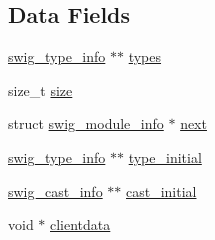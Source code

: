 \subsection*{Data Fields}
\begin{DoxyCompactItemize}
\item 
\hyperlink{structswig__type__info}{swig\-\_\-type\-\_\-info} $\ast$$\ast$ \hyperlink{structswig__module__info_ab3f7a3650d62b94bd66b389d74eec755}{types}
\item 
size\-\_\-t \hyperlink{structswig__module__info_a854352f53b148adc24983a58a1866d66}{size}
\item 
struct \hyperlink{structswig__module__info}{swig\-\_\-module\-\_\-info} $\ast$ \hyperlink{structswig__module__info_af0954fbff8a3ad66e8e856a4f544a3d9}{next}
\item 
\hyperlink{structswig__type__info}{swig\-\_\-type\-\_\-info} $\ast$$\ast$ \hyperlink{structswig__module__info_a54e7d318722d57d376b4d394d254228f}{type\-\_\-initial}
\item 
\hyperlink{structswig__cast__info}{swig\-\_\-cast\-\_\-info} $\ast$$\ast$ \hyperlink{structswig__module__info_a4185798e8e6242699bc018f9183a674c}{cast\-\_\-initial}
\item 
void $\ast$ \hyperlink{structswig__module__info_ae60177f52d83fcd32268d79f2aa8012f}{clientdata}
\end{DoxyCompactItemize}


